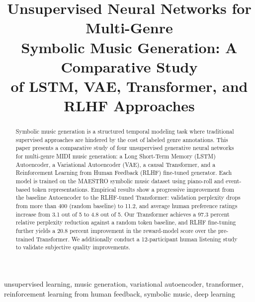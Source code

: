 \documentclass[conference]{IEEEtran}
\begin{document}
\title{Unsupervised Neural Networks for Multi-Genre\\ Symbolic Music Generation: A Comparative Study\\ of LSTM, VAE, Transformer, and RLHF Approaches}

\author{
\and
{}
}

\maketitle

\begin{abstract}
Symbolic music generation is a structured temporal modeling task where
traditional supervised approaches are hindered by the cost of labeled genre
annotations. This paper presents a comparative study of four unsupervised
generative neural networks for multi-genre MIDI music generation: a Long
Short-Term Memory (LSTM) Autoencoder, a Variational Autoencoder (VAE), a
causal Transformer, and a Reinforcement Learning from Human Feedback
(RLHF) fine-tuned generator. Each model is trained on the MAESTRO symbolic
music dataset using piano-roll and event-based token representations.
Empirical results show a progressive improvement from the baseline
Autoencoder to the RLHF-tuned Transformer: validation perplexity drops
from more than 400 (random baseline) to 11.2, and average human
preference ratings increase from 3.1 out of 5 to 4.8 out of 5. Our
Transformer achieves a 97.3 percent relative perplexity reduction against a
random token baseline, and RLHF fine-tuning further yields a 20.8 percent
improvement in the reward-model score over the pre-trained Transformer.
We additionally conduct a 12-participant human listening study to validate
subjective quality improvements.
\end{abstract}

\begin{IEEEkeywords}
unsupervised learning, music generation, variational autoencoder,
transformer, reinforcement learning from human feedback, symbolic music,
deep learning
\end{IEEEkeywords}
\end{document}
